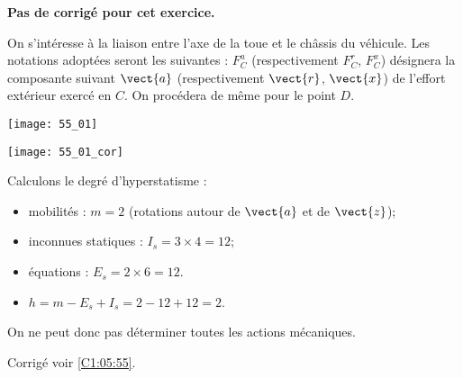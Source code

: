 \normalfalse \difficiletrue \tdifficilefalse
\correctiontrue


\setcounter{question}{0}
\ifcorrection
\else
\textbf{Pas de corrigé pour cet exercice.}
\fi

\ifprof
\else
On s'intéresse à la liaison entre l'axe de la toue et le châssis du véhicule. Les notations adoptées seront les suivantes : $F^a_{C}$ (respectivement $F^r_{C}$, $F^x_{C}$) désignera la composante suivant $\vect{a}$ (respectivement $\vect{r}$, $\vect{x}$) de l'effort extérieur exercé en $C$. On procédera de même pour le point $D$. 
\begin{center}
\texttt{[image: 55\_01]}
\end{center}


\fi

\ifprof
\begin{center}
\texttt{[image: 55\_01\_cor]}
\end{center}

\else
\fi



\ifprof
Calculons le degré d'hyperstatisme : 
\begin{itemize}
\item mobilités : $m=2$ (rotations autour de $\vect{a}$ et de $\vect{z}$);
\item inconnues statiques : $I_s = 3 \times 4 = 12$;
\item équations : $E_s = 2\times 6=12$. 
\item $h = m-E_s + I_s= 2 -12 + 12 = 2$.
\end{itemize}
On ne peut donc pas déterminer toutes les actions mécaniques. 

\else
\fi
\ifprof
\else
\begin{flushright}
\footnotesize{Corrigé  voir \ref{C1:05:55}.}
\end{flushright}%
\fi
